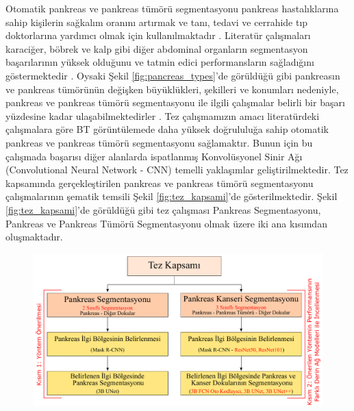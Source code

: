 Otomatik pankreas ve pankreas tümörü segmentasyonu pankreas hastalıklarına sahip kişilerin sağkalım oranını artırmak ve tanı, tedavi ve cerrahide tıp doktorlarına yardımcı olmak için kullanılmaktadır \cite{peery2019burden}. Literatür çalışmaları karaciğer, böbrek ve kalp gibi diğer abdominal organların segmentasyon başarılarının yüksek olduğunu ve tatmin edici performansların sağladığını göstermektedir \cite{peng2020method,wittenstein2019automatic,ahn2019comparative}. Oysaki Şekil \ref{fig:pancreas_types}'de görüldüğü gibi pankreasın ve pankreas tümörünün değişken büyüklükleri, şekilleri ve konumları nedeniyle, pankreas ve pankreas tümörü segmentasyonu ile ilgili çalışmalar belirli bir başarı yüzdesine kadar ulaşabilmektedirler \cite{zhao2019fully}. Tez çalışmamızın amacı literatürdeki çalışmalara göre BT görüntülemede daha yüksek doğrululuğa sahip otomatik pankreas ve pankreas tümörü segmentasyonu sağlamaktır. Bunun için bu çalışmada başarısı diğer alanlarda ispatlanmış Konvolüsyonel Sinir Ağı (Convolutional Neural Network - CNN) temelli yaklaşımlar geliştirilmektedir. Tez kapsamında gerçekleştirilen pankreas ve pankreas tümörü segmentasyonu çalışmalarının şematik temsili Şekil \ref{fig:tez_kapsami}'de gösterilmektedir. Şekil \ref{fig:tez_kapsami}'de görüldüğü gibi tez çalışması Pankreas Segmentasyonu, Pankreas ve Pankreas Tümörü Segmentasyonu olmak üzere iki ana kısımdan oluşmaktadır. 

\begin{figure}[h!]
	\begin{center}
		\vspace{0.4cm}
		{
			\vspace{0.4cm}
			\includegraphics[scale=0.5]{Genel-Bilgiler/Figures/tezin_kapsami.pdf}
		}
	\end{center}
\end{figure}

